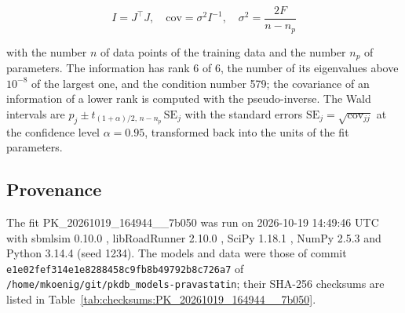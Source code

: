 \documentclass{article}
\begin{document}
\begin{equation}
I = J^\top J, \quad \mathrm{cov} = \sigma^2 I^{-1}, \quad \sigma^2 = \frac{2 F}{n - n_p}
\end{equation}

with the number $n$ of data points of the training data and the number $n_p$ of parameters. The information has rank 6 of 6, the number of its eigenvalues above $10^{-8}$ of the largest one, and the condition number 579; the covariance of an information of a lower rank is computed with the pseudo-inverse. The Wald intervals are $\hat{p}_j \pm t_{(1+\alpha)/2,\, n-n_p}\, \mathrm{SE}_j$ with the standard errors $\mathrm{SE}_j = \sqrt{\mathrm{cov}_{jj}}$ at the confidence level $\alpha = 0.95$, transformed back into the units of the fit parameters.

\subsection{Provenance}

The fit PK\_20261019\_164944\_\_7b050 was run on 2026-10-19 14:49:46 UTC with sbmlsim 0.10.0 \cite{Koenig2026_sbmlsim}, libRoadRunner 2.10.0 \cite{Welsh2023}, SciPy 1.18.1 \cite{Virtanen2020}, NumPy 2.5.3 \cite{Harris2020} and Python 3.14.4 (seed 1234). The models and data were those of commit \texttt{e1e02fef314e1e8288458c9fb8b49792b8c726a7} of \texttt{/home/mkoenig/git/pkdb\_models-pravastatin}; their SHA-256 checksums are listed in Table~\ref{tab:checksums:PK_20261019_164944__7b050}.
\end{document}
